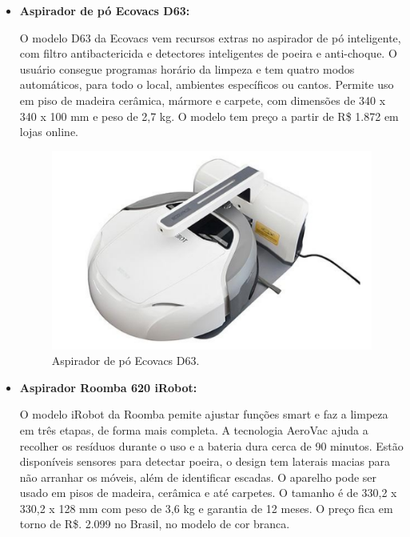 \begin{itemize}
		\item \textbf{Aspirador de pó Ecovacs D63:}

			O modelo D63 da Ecovacs vem recursos extras no aspirador de pó inteligente, com filtro antibactericida e detectores inteligentes de poeira e anti-choque. O usuário consegue programas horário da limpeza e tem quatro modos automáticos, para todo o local, ambientes específicos ou cantos. Permite uso em piso de madeira cerâmica, mármore e carpete, com dimensões de 340 x 340 x 100 mm e peso de 2,7 kg.  O modelo tem preço a partir de R\$ 1.872 em lojas online.

			\begin{figure}[H]
				\centering
				\includegraphics[scale=0.55]{figuras/pm_ecovacs_d63.png}
				\caption{Aspirador de pó Ecovacs D63.}
				\label{img:pm_ecovacs_d63}
			\end{figure}

		\item \textbf{Aspirador Roomba 620 iRobot:}

			O modelo iRobot da Roomba pemite ajustar funções smart e faz a limpeza em três etapas, de forma mais completa. A tecnologia AeroVac ajuda a recolher os resíduos durante o uso e a bateria dura cerca de 90 minutos. Estão disponíveis sensores para detectar poeira, o design tem laterais macias para não arranhar os móveis, além de identificar escadas. O aparelho pode ser usado em pisos de madeira, cerâmica e até carpetes. O tamanho é de 330,2 x 330,2 x 128 mm com peso de 3,6 kg e garantia de 12 meses. O preço fica em torno de R\$. 2.099 no Brasil, no modelo de cor branca.


\end{itemize}
